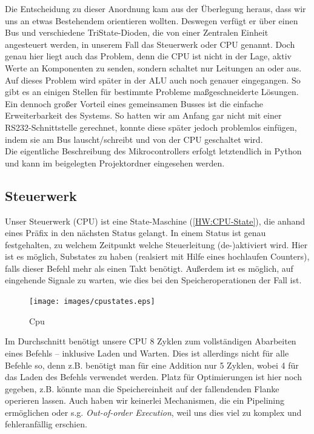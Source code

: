 Die Entscheidung zu dieser Anordnung kam aus der Überlegung heraus, dass wir uns an etwas Bestehendem orientieren wollten. Deswegen verfügt er über einen Bus und verschiedene TriState-Dioden, die von einer Zentralen Einheit angesteuert werden, in unserem Fall das Steuerwerk oder CPU genannt. Doch genau hier liegt auch das Problem, denn die CPU ist nicht in der Lage, aktiv Werte an Komponenten zu senden, sondern schaltet nur Leitungen an oder aus. Auf dieses Problem wird später in der ALU auch noch genauer eingegangen. So gibt es an einigen Stellen für bestimmte Probleme maßgeschneiderte Lösungen.\\
Ein dennoch großer Vorteil eines gemeinsamen Busses ist die einfache Erweiterbarkeit des Systems. So hatten wir am Anfang gar nicht mit einer RS232-Schnittstelle gerechnet, konnte diese später jedoch problemlos einfügen, indem sie am Bus lauscht/schreibt und von der CPU geschaltet wird.\\
Die eigentliche Beschreibung des Mikrocontrollers erfolgt letztendlich in Python und kann im beigelegten Projektordner eingesehen werden.

\subsection{Steuerwerk}
Unser Steuerwerk (CPU) ist eine State-Maschine (\autoref{HW:CPU-State}), die anhand eines Präfix in den nächsten Status gelangt. In einem Status ist genau festgehalten, zu welchem Zeitpunkt welche Steuerleitung (de-)aktiviert wird. Hier ist es möglich, Substates zu haben (realsiert mit Hilfe eines hochlaufen Counters), falls dieser Befehl mehr als einen Takt benötigt. Außerdem ist es möglich, auf eingehende Signale zu warten, wie dies bei den Speicheroperationen der Fall ist. 

\begin{figure}[h]
\centering
\texttt{[image: images/cpustates.eps]}
\caption{\label{HW:CPU-State}Cpu}
\end{figure}

Im Durchschnitt benötigt unsere CPU 8 Zyklen zum vollständigen Abarbeiten eines Befehls -- inklusive Laden und Warten. Dies ist allerdings nicht für alle Befehle so, denn z.B. benötigt man für eine Addition nur 5 Zyklen, wobei 4 für das Laden des Befehls verwendet werden. Platz für Optimierungen ist hier noch gegeben, z.B. könnte man die Speichereinheit auf der fallendenden Flanke operieren lassen. Auch haben wir keinerlei Mechanismen, die ein Pipelining ermöglichen oder s.g. \emph{Out-of-order Execution}, weil uns dies viel zu komplex und fehleranfällig erschien.


